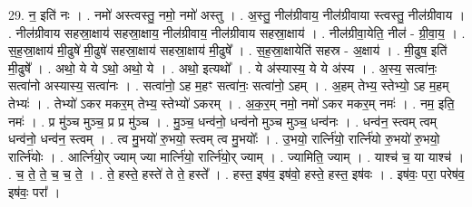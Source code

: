 \documentclass[17pt]{extarticle}
\begin{document}
29. न॒ इति॑ नः । . नमो॑ अस्त्वस्तु॒ नमो॒ नमो॑ अस्तु । . अ॒स्तु॒ नील॑ग्रीवाय॒ नील॑ग्रीवाया स्त्वस्तु॒ नील॑ग्रीवाय । . नील॑ग्रीवाय सहस्रा॒क्षाय॑ सहस्रा॒क्षाय॒ नील॑ग्रीवाय॒ नील॑ग्रीवाय सहस्रा॒क्षाय॑ । . नील॑ग्रीवा॒येति॒ नील॑ - ग्री॒वा॒य॒ । . स॒ह॒स्रा॒क्षाय॑ मी॒ढुषे॑ मी॒ढुषे॑ सहस्रा॒क्षाय॑ सहस्रा॒क्षाय॑ मी॒ढुषे᳚ । . स॒ह॒स्रा॒क्षायेति॑ सहस्र - अ॒क्षाय॑ । . मी॒ढुष॒ इति॑ मी॒ढुषे᳚ । . अथो॒ ये ये ऽथो॒ अथो॒ ये । . अथो॒ इत्यथो᳚ । . ये अ॑स्यास्य॒ ये ये अ॑स्य । . अ॒स्य॒ सत्वा॑नः॒ सत्वा॑नो अस्यास्य॒ सत्वा॑नः । . सत्वा॑नो॒ ऽह म॒हꣳ सत्वा॑नः॒ सत्वा॑नो॒ ऽहम् । . अ॒हम् तेभ्य॒ स्तेभ्यो॒ ऽह म॒हम् तेभ्यः॑ । . तेभ्यो॑ ऽकर मकर॒म् तेभ्य॒ स्तेभ्यो॑ ऽकरम् । . अ॒क॒र॒म् नमो॒ नमो॑ ऽकर मकर॒म् नमः॑ । . नम॒ इति॒ नमः॑ । . प्र मु॑ञ्च मुञ्च॒ प्र प्र मु॑ञ्च । . मु॒ञ्च॒ धन्व॑नो॒ धन्व॑नो मुञ्च मुञ्च॒ धन्व॑नः । . धन्व॑न॒ स्त्वम् त्वम् धन्व॑नो॒ धन्व॑न॒ स्त्वम् । . त्व मु॒भयो॑ रु॒भयो॒ स्त्वम् त्व मु॒भयोः᳚ । . उ॒भयो॒ रार्त्नि॑यो॒ रार्त्नि॑यो रु॒भयो॑ रु॒भयो॒ रार्त्नि॑योः । . आर्त्नि॑यो॒र् ज्याम् ज्या मार्त्नि॑यो॒ रार्त्नि॑यो॒र् ज्याम् । . ज्यामिति॒ ज्याम् । . याश्च॑ च॒ या याश्च॑ । . च॒ ते॒ ते॒ च॒ च॒ ते॒ । . ते॒ हस्ते॒ हस्ते॑ ते ते॒ हस्ते᳚ । . हस्त॒ इष॑व॒ इष॑वो॒ हस्ते॒ हस्त॒ इष॑वः । . इष॑वः॒ परा॒ परेष॑व॒ इष॑वः॒ परा᳚ । \newline
\end{document}
